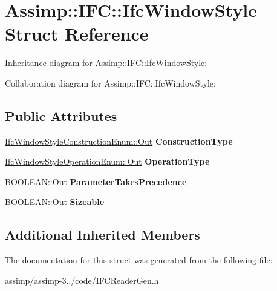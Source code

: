 \hypertarget{struct_assimp_1_1_i_f_c_1_1_ifc_window_style}{\section{Assimp\+:\+:I\+F\+C\+:\+:Ifc\+Window\+Style Struct Reference}
\label{struct_assimp_1_1_i_f_c_1_1_ifc_window_style}
}


Inheritance diagram for Assimp\+:\+:I\+F\+C\+:\+:Ifc\+Window\+Style\+:


Collaboration diagram for Assimp\+:\+:I\+F\+C\+:\+:Ifc\+Window\+Style\+:
\subsection*{Public Attributes}
\begin{DoxyCompactItemize}
\item 
\hypertarget{struct_assimp_1_1_i_f_c_1_1_ifc_window_style_adfc0ac0902a72733f657fdd1fdf8dbb4}{\hyperlink{classboost_1_1shared__ptr}{Ifc\+Window\+Style\+Construction\+Enum\+::\+Out} {\bfseries Construction\+Type}}\label{struct_assimp_1_1_i_f_c_1_1_ifc_window_style_adfc0ac0902a72733f657fdd1fdf8dbb4}

\item 
\hypertarget{struct_assimp_1_1_i_f_c_1_1_ifc_window_style_aab60619bbc1166cff25b458d148dc2f9}{\hyperlink{classboost_1_1shared__ptr}{Ifc\+Window\+Style\+Operation\+Enum\+::\+Out} {\bfseries Operation\+Type}}\label{struct_assimp_1_1_i_f_c_1_1_ifc_window_style_aab60619bbc1166cff25b458d148dc2f9}

\item 
\hypertarget{struct_assimp_1_1_i_f_c_1_1_ifc_window_style_aaf35d7103ebe9505cb89f427678939a0}{\hyperlink{classboost_1_1shared__ptr}{B\+O\+O\+L\+E\+A\+N\+::\+Out} {\bfseries Parameter\+Takes\+Precedence}}\label{struct_assimp_1_1_i_f_c_1_1_ifc_window_style_aaf35d7103ebe9505cb89f427678939a0}

\item 
\hypertarget{struct_assimp_1_1_i_f_c_1_1_ifc_window_style_a73125116b10727f1336b44a82c1ed21d}{\hyperlink{classboost_1_1shared__ptr}{B\+O\+O\+L\+E\+A\+N\+::\+Out} {\bfseries Sizeable}}\label{struct_assimp_1_1_i_f_c_1_1_ifc_window_style_a73125116b10727f1336b44a82c1ed21d}

\end{DoxyCompactItemize}
\subsection*{Additional Inherited Members}


The documentation for this struct was generated from the following file\+:\begin{DoxyCompactItemize}
\item 
assimp/assimp-\/3../code/I\+F\+C\+Reader\+Gen.\+h\end{DoxyCompactItemize}
